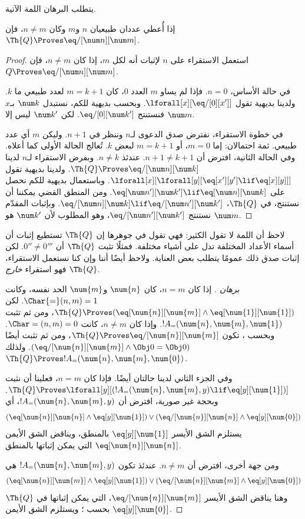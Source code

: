 \documentclass[../../../include/open-logic-section]{subfiles}
\begin{document}
يتطلب البرهان اللمة الآتية.

\begin{lem}
 إذا أُعطي عددان طبيعيان $n$ و$m$ وكان
$n\neq m$، فإن $\Th{Q}\Proves\eq/[\num n][\num m]$.
\end{lem}

\begin{proof}
استعمل الاستقراء على $n$ لإثبات أنه لكل $m$، إذا كان $n\neq m$، فإن
$Q\Proves\eq/[\num n][\num m]$.

في حالة الأساس، $n=0$. فإذا لم يساو $m$ العدد $0$، كان $m=k+1$ لعدد
طبيعي ما $k$. ولدينا بديهية تقول $\lforall[x][\eq/[0][x']]$. وبحسب
بديهية للكم، نستبدل $\num k$ بـ$x$ فنستنتج $\eq/[0][\num k']$. لكن
$\num k'$ ليس إلا $\num m$.

في خطوة الاستقراء، نفترض صدق الدعوى لـ$n$ وننظر في $n+1$. وليكن $m$
أي عدد طبيعي. ثمة احتمالان: إما $m=0$، أو $m=k+1$ لبعض $k$. تُعالج
الحالة الأولى كما أعلاه. وفي الحالة الثانية، افترض أن
$n+1\neq k+1$. عندئذ $n\neq k$. وبفرض الاستقراء لـ$n$ لدينا
$\Th{Q}\Proves\eq/[\num n][\num k]$. ولدينا بديهية تقول
$\lforall[x][\lforall[y][\eq[x'][y']\lif\eq[x][y]]]$. وباستعمال
بديهية للكم نحصل على
$\eq[\num n'][\num k']\lif\eq[\num n][\num k]$. ومن المنطق القضي
يمكننا أن نستنتج، في $\Th{Q}$،
$\eq/[\num n][\num k]\lif\eq/[\num n'][\num k']$. وبإثبات المقدّم
نستنتج $\eq/[\num n'][\num k']$، وهو المطلوب لأن $\num k'$ هو
$\num m$.
\end{proof}

\begin{explain}
لاحظ أن اللمة لا تقول الكثير: فهي تقول في جوهرها إن $\Th{Q}$ تستطيع
إثبات أن أسماء الأعداد المختلفة تدل على أشياء مختلفة. فمثلًا تثبت
$\Th{Q}$ أن $0''\neq0'''$. لكن إثبات صدق ذلك عمومًا يتطلب بعض العناية.
ولاحظ أيضًا أننا وإن كنا نستعمل الاستقراء، فهو استقراء \emph{خارج}
$\Th{Q}$.
\end{explain}

\begin{proof}[برهان ]
إذا كان $n=m$، كان $\num{n}$ و$\num{m}$ الحد نفسه، وكانت
$\Char{=}(n,m)=1$. لكن
$\Th{Q}\Proves(\eq[\num{n}][\num{m}]\land\eq[\num{1}][\num{1}])$،
ومن ثم تثبت $!A_=(\num{n},\num{m},\num{1})$. وإذا كان $n\neq m$،
كانت $\Char=(n,m)=0$. وبحسب ، تكون
$\Th{Q}\Proves\eq/[\num{n}][\num{m}]$، ومن ثم تثبت أيضًا
$(\eq/[\num{n}][\num{m}]\land\Obj 0=\Obj 0)$. ولذلك
$\Th{Q}\Proves !A_=(\num{n},\num{m},\num{0})$.

وفي الجزء الثاني لدينا حالتان أيضًا. فإذا كان $n=m$، فعلينا أن نثبت
$\Th{Q}\Proves\lforall[y][(!A_=(\num{n},\num{m},y)
\lif\eq[y][\num{1}])]$. وبحجة غير صورية، افترض أن
$!A_=(\num{n},\num{m},y)$، أي
\[
(\eq[\num{n}][\num{n}] \land \eq[y][\num{1}]) \lor
(\eq/[\num{n}][\num{n}] \land \eq[y][\num{0}])
\]
يستلزم الشق الأيسر $\eq[y][\num{1}]$ بالمنطق، ويناقض الشق الأيمن
$\eq[\num{n}][\num{n}]$ التي يمكن إثباتها بالمنطق.

ومن جهة أخرى، افترض أن $n\neq m$. عندئذ تكون
$!A_=(\num{n},\num{m},y)$ هي
\[
(\eq[\num{n}][\num{m}] \land \eq[y][\num{1}]) \lor
(\eq/[\num{n}][\num{m}] \land \eq[y][\num{0}])
\]
وهنا يناقض الشق الأيسر $\eq/[\num{n}][\num{m}]$، التي يمكن إثباتها في
$\Th{Q}$ بحسب ؛ ويستلزم الشق الأيمن
$\eq[y][\num{0}]$.
\end{proof}
\end{document}
